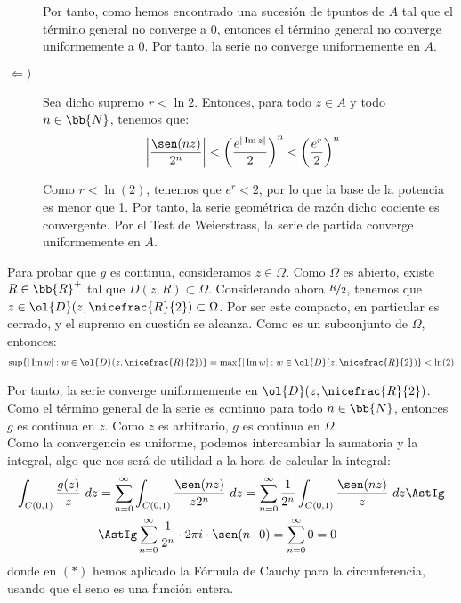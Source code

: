 \documentclass[12pt]{article}
\renewcommand{\Im}{\operatorname{Im}}
\begin{document}
\begin{ejercicio}[4 puntos]
\begin{description}
            Por tanto, como hemos encontrado una sucesión de tpuntos de $A$ tal que el término general no converge a $0$, entonces el término general no converge uniformemente a $0$. Por tanto, la serie no converge uniformemente en $A$.

            \item[$\Longleftarrow)$] Sea dicho supremo $r<\ln 2$. Entonces, para todo $z\in A$ y todo $n\in \bb{N}$, tenemos que:
            \begin{align*}
                \left|\dfrac{\sen(nz)}{2^n}\right| &<\left(\dfrac{e^{|\Im z|}}{2}\right)^n
                < \left(\dfrac{e^{r}}{2}\right)^n
            \end{align*}

            Como $r<\ln(2)$, tenemos que $e^{r}<2$, por lo que la base de la potencia es menor que 1. Por tanto, la serie geométrica de razón dicho cociente es convergente. Por el Test de Weierstrass, la serie de partida converge uniformemente en $A$.
        \end{description}

        Para probar que $g$ es continua, consideramos $z\in \Omega$. Como $\Omega$ es abierto, existe $R\in \bb{R}^+$ tal que $D(z,R)\subset \Omega$. Considerando ahora $\nicefrac{R}{2}$, tenemos que $z\in \ol{D}(z,\nicefrac{R}{2})\subset \Omega$. Por ser este compacto, en particular es cerrado, y el supremo en cuestión se alcanza. Como es un subconjunto de $\Omega$, entonces:
        \begin{align*}
            \sup\{|\Im w| : w\in \ol{D}(z,\nicefrac{R}{2})\}=\max\{|\Im w| : w\in \ol{D}(z,\nicefrac{R}{2})\} < \ln(2)
        \end{align*}

        Por tanto, la serie converge uniformemente en $\ol{D}(z,\nicefrac{R}{2})$. Como el término general de la serie es continuo para todo $n\in \bb{N}$, entonces $g$ es continua en $z$. Como $z$ es arbitrario, $g$ es continua en $\Omega$.\\

        Como la convergencia es uniforme, podemos intercambiar la sumatoria y la integral, algo que nos será de utilidad a la hora de calcular la integral:
        \begin{align*}
            \int_{C(0,1)} \frac{g(z)}{z}\ dz &= \sum_{n=0}^{\infty} \int_{C(0,1)} \frac{\sen(nz)}{z2^n}\ dz
            = \sum_{n=0}^{\infty} \frac{1}{2^n}\int_{C(0,1)} \frac{\sen(nz)}{z}\ dz \AstIg\\&\AstIg \sum_{n=0}^{\infty} \frac{1}{2^n}\cdot 2\pi i \cdot \sen (n\cdot 0) = \sum_{n=0}^{\infty} 0 = 0
        \end{align*}
        donde en $(\ast)$ hemos aplicado la Fórmula de Cauchy para la circunferencia, usando que el seno es una función entera.
    \end{ejercicio}
\end{document}
